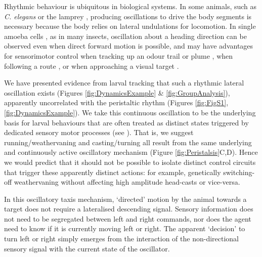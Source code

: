 \documentclass[11pt,a4paper]{article}
\begin{document}
 Rhythmic behaviour is ubiquitous in biological systems. In some animals, such as {\it C. elegans} \citep{iino2009parallel,izquierdo2010evolution,lockery2011computational}  or the lamprey  \citep{lansner1997realistic,wilson1999spikes}, producing oscillations to drive the body segments is necessary because the body relies on lateral undulations for locomotion.
 In single amoeba cells \citep{yangzigzag2011}, as in many insects, oscillation about a heading direction can be observed even when direct forward motion is possible, and may have advantages for sensorimotor control when tracking up an odour trail  \citep{hangartner1969structure,farkas1972chemical} or plume \citep{budick2006free,belanger1996centrally,willis1997centrally,willis2008effects,carde2008navigational}  , when following a route \citep{lent2010image,kodzhabashev2015route}, or when approaching a visual target \citep{wallace1962experiments,philippides2013bumblebee,voss1998active}.

 We have presented evidence from larval tracking that such a rhythmic lateral oscillation exists (Figures \ref{fig:DynamicsExample} \& \ref{fig:GroupAnalysis}), apparently uncorrelated with the peristaltic rhythm (Figures \ref{fig:FigS1},\ref{fig:DynamicsExample}).
We take this continuous oscillation to be the underlying basis for larval behaviours that are often treated as distinct states triggered by dedicated sensory motor processes (see \cite{green1983organization,sawin1994sensorimotor, cobbwhatandhow1999,vogelstein2014discovery, gomez2012active, gomez2014multilevel, hernandez2015reverse,gepner2015computations}).
 That is, we suggest running/weathervaning and casting/turning all result from the same underlying and continuously active oscillatory mechanism (Figure \ref{fig:Peristalsis}C,D).
  Hence we would predict that it should not be possible to isolate distinct control circuits that trigger these apparently distinct actions: for example, genetically switching-off weathervaning without affecting high amplitude head-casts or vice-versa.

In this oscillatory taxis mechanism, ‘directed’ motion by the animal towards a target does not require a lateralised descending signal. Sensory information does not need to be segregated between left and right commands, nor does the agent need to know if it is currently moving left or right. The apparent ‘decision’ to turn left or right simply emerges from the interaction of the non-directional sensory signal with the current state of the oscillator. 
\end{document}
